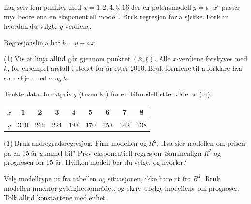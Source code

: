 
Lag selv fem punkter med $x = 1, 2, 4, 8, 16$ der en potensmodell $y = a \cdot x^b$ passer mye bedre enn en eksponentiell modell.
Bruk regresjon for å sjekke. Forklar hvordan du valgte $y$-verdiene.

Regresjonslinja har $b = \bar y - a\,\bar x$.
\begin{tasks}(1)
  \task Vis at linja alltid går gjennom punktet $(\bar x, \bar y)$.
  \task Alle $x$-verdiene forskyves med $k$, for eksempel årstall i stedet for år etter 2010. Bruk formlene til å forklare hva som skjer med $a$ og $b$.
\end{tasks}

Tenkte data: bruktpris $y$ (tusen kr) for en bilmodell etter alder $x$ (år).

\smallskip
\begin{tabular}{@{}c|cccccccc@{}}
$x$ & 1 & 2 & 3 & 4 & 5 & 6 & 7 & 8\\ \hline
$y$ & 310 & 262 & 224 & 193 & 170 & 153 & 142 & 138\\
\end{tabular}

\begin{tasks}(1)
  \task Bruk andregradsregresjon. Finn modellen og $R^2$.
  \task Hva sier modellen om prisen på en 15 år gammel bil?
  \task Prøv eksponentiell regresjon. Sammenlign $R^2$ og prognosen for 15 år. Hvilken modell bør du velge, og hvorfor?
\end{tasks}

\begin{oppsummering}
Velg modelltype ut fra tabellen og situasjonen, ikke bare ut fra $R^2$.
Bruk modellen innenfor gyldighetsområdet, og skriv «ifølge modellen» om prognoser.
Tolk alltid konstantene med enhet.
\end{oppsummering}
